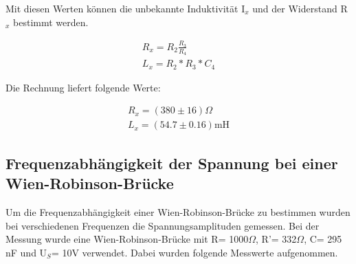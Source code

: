 Mit diesen Werten können die unbekannte Induktivität I$_x$ und der Widerstand R$_x$ bestimmt werden.

\begin{align*}
    R_x = R_2 \frac{R_3}{R_4}\\
    L_x = R_2 * R_3 * C_4
\end{align*}

Die Rechnung liefert folgende Werte:

\begin{align*}
    R_x = (380\pm 16)\Omega \\
    L_x = (54.7\pm 0.16)\text{mH}
\end{align*}

\subsection{Frequenzabhängigkeit der Spannung bei einer Wien-Robinson-Brücke}

Um die Frequenzabhängigkeit einer Wien-Robinson-Brücke zu bestimmen wurden bei verschiedenen Frequenzen die Spannungsamplituden gemessen. Bei der Messung wurde eine Wien-Robinson-Brücke mit R= 1000$\Omega$, R'= 332$\Omega$, C= 295 nF und U$_S$= 10V verwendet. Dabei wurden folgende Messwerte aufgenommen.

